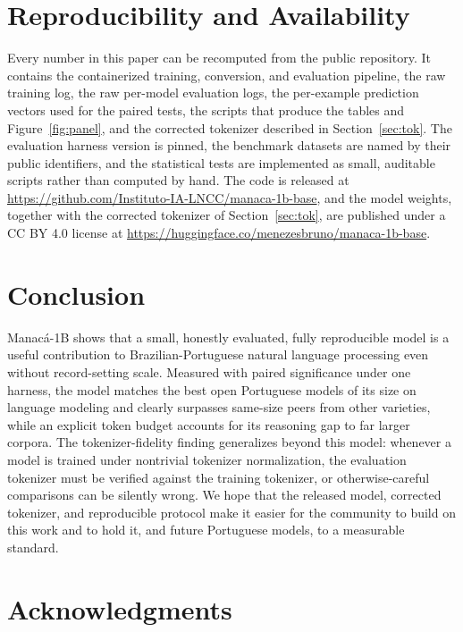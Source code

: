 \documentclass[11pt]{article}
\begin{document}
\section{Reproducibility and Availability}

Every number in this paper can be recomputed from the public repository. It contains
the containerized training, conversion, and evaluation pipeline, the raw training log,
the raw per-model evaluation logs, the per-example prediction vectors used for the
paired tests, the scripts that produce the tables and Figure~\ref{fig:panel}, and the
corrected tokenizer described in Section~\ref{sec:tok}. The evaluation harness version
is pinned, the benchmark datasets are named by their public identifiers, and the
statistical tests are implemented as small, auditable scripts rather than computed by
hand. The code is released at
\url{https://github.com/Instituto-IA-LNCC/manaca-1b-base}, and the model weights,
together with the corrected tokenizer of Section~\ref{sec:tok}, are published under a
CC BY 4.0 license at \url{https://huggingface.co/menezesbruno/manaca-1b-base}.

\section{Conclusion}

Manac\'a-1B shows that a small, honestly evaluated, fully reproducible model is a
useful contribution to Brazilian-Portuguese natural language processing even without
record-setting scale. Measured with paired significance under one harness, the model
matches the best open Portuguese models of its size on language modeling and clearly
surpasses same-size peers from other varieties, while an explicit token budget
accounts for its reasoning gap to far larger corpora. The tokenizer-fidelity finding
generalizes beyond this model: whenever a model is trained under nontrivial tokenizer
normalization, the evaluation tokenizer must be verified against the training
tokenizer, or otherwise-careful comparisons can be silently wrong. We hope that the
released model, corrected tokenizer, and reproducible protocol make it easier for the
community to build on this work and to hold it, and future Portuguese models, to a
measurable standard.

\section*{Acknowledgments}
\end{document}
